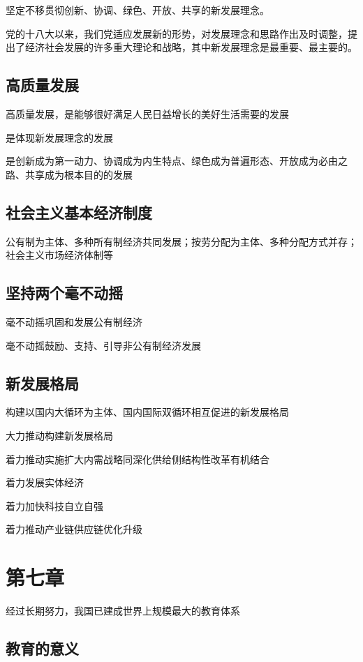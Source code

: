 \documentclass[11pt, a4paper]{article}
\begin{document}
坚定不移贯彻创新、协调、绿色、开放、共享的新发展理念。

党的十八大以来，我们党适应发展新的形势，对发展理念和思路作出及时调整，提出了经济社会发展的许多重大理论和战略，其中新发展理念是最重要、最主要的。

\subsection*{高质量发展}

高质量发展，是能够很好满足人民日益增长的美好生活需要的发展

是体现新发展理念的发展

是创新成为第一动力、协调成为内生特点、绿色成为普遍形态、开放成为必由之路、共享成为根本目的的发展

\subsection*{社会主义基本经济制度}

公有制为主体、多种所有制经济共同发展；按劳分配为主体、多种分配方式并存；社会主义市场经济体制等

\subsection*{坚持两个毫不动摇}

毫不动摇巩固和发展公有制经济

毫不动摇鼓励、支持、引导非公有制经济发展

\subsection*{新发展格局}

构建以国内大循环为主体、国内国际双循环相互促进的新发展格局

大力推动构建新发展格局

着力推动实施扩大内需战略同深化供给侧结构性改革有机结合

着力发展实体经济

着力加快科技自立自强

着力推动产业链供应链优化升级

\section*{第七章}

经过长期努力，我国已建成世界上规模最大的教育体系

\subsection*{教育的意义}
\end{document}
